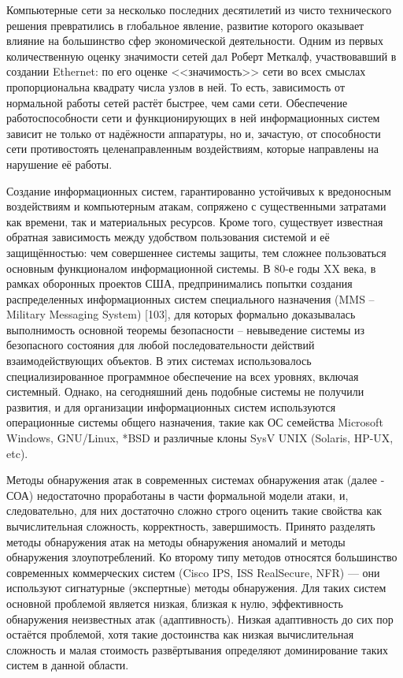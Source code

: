 Компьютерные сети за несколько последних десятилетий из чисто технического решения превратились в глобальное явление, развитие которого оказывает влияние на большинство сфер экономической деятельности. Одним из первых количественную оценку значимости сетей дал Роберт Меткалф, участвовавший в создании Ethernet: по его оценке <<значимость>> сети во всех смыслах пропорциональна квадрату числа узлов в ней. То есть, зависимость от нормальной работы сетей растёт быстрее, чем сами сети. Обеспечение работоспособности сети и функционирующих в ней информационных систем зависит не только от надёжности аппаратуры, но и, зачастую, от способности сети противостоять целенаправленным воздействиям, которые направлены на нарушение её работы.

Создание информационных систем, гарантированно устойчивых к вредоносным воздействиям и компьютерным атакам, сопряжено с существенными затратами как времени, так и материальных ресурсов. Кроме того, существует известная обратная зависимость между удобством пользования системой и её защищённостью: чем совершеннее системы защиты, тем сложнее пользоваться основным функционалом информационной системы. В 80-е годы XX века, в рамках оборонных проектов США, предпринимались попытки создания распределенных информационных систем специального назначения (MMS – Military Messaging System) [103], для которых формально доказывалась выполнимость основной теоремы безопасности – невыведение системы из безопасного состояния для любой последовательности действий взаимодействующих объектов. В этих системах использовалось специализированное программное обеспечение на всех уровнях, включая системный. Однако, на сегодняшний день подобные системы не получили развития, и для организации информационных систем используются операционные системы общего назначения, такие как ОС семейства Microsoft Windows, GNU/Linux, *BSD и различные клоны SysV UNIX (Solaris, HP-UX, etc).

Методы обнаружения атак в современных системах обнаружения атак (далее - СОА) недостаточно проработаны в части формальной модели атаки, и, следовательно, для них достаточно сложно строго оценить такие свойства как вычислительная сложность, корректность, завершимость. Принято разделять методы обнаружения атак на методы обнаружения аномалий и методы обнаружения злоупотреблений. Ко второму типу методов относятся большинство современных коммерческих систем (Cisco IPS, ISS RealSecure, NFR) --- они используют сигнатурные (экспертные) методы обнаружения. Для таких систем основной проблемой является низкая, близкая к нулю, эффективность обнаружения неизвестных атак (адаптивность). Низкая адаптивность до сих пор остаётся проблемой, хотя такие достоинства как низкая вычислительная сложность и малая стоимость развёртывания определяют доминирование таких систем в данной области.


